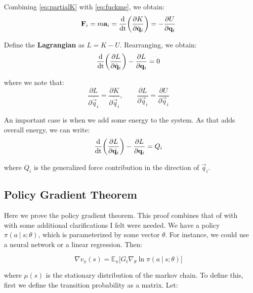 \documentclass{article}
\newcommand{\giv}{\ |\ }
\begin{document}
Combining \autoref{eq:partialK} with \autoref{eq:fuckme}, we obtain:
\begin{equation}
    \mathbf{F}_i = m \mathbf{a}_i = \frac{\mathrm{d}}{\mathrm{dt}} \bigg( \frac{\partial K}{\partial \dot{\mathbf{q}}_i} \bigg) = - \frac{\partial U}{\partial \mathbf{q}_i}
\end{equation}

Define the \textbf{Lagrangian} as $L = K - U$. Rearranging, we obtain:
\begin{equation*}
    \frac{\mathrm{d}}{\mathrm{dt}} \bigg( \frac{\partial L}{\partial \dot{\mathbf{q}}_i} \bigg) - \frac{\partial L}{\partial \mathbf{q}_i} = 0
\end{equation*}

where we note that:
\begin{equation*}
    \frac{\partial L}{\partial \dot{\vec{q}_i}} = \frac{\partial K}{\partial \dot{\vec{q}}_i}, \quad \quad \frac{\partial L}{\partial \vec{q}_i} = \frac{\partial U}{\partial \vec{q}_i}
\end{equation*}

An important case is when we add some energy to the system. As that adds overall energy, we can write:
\begin{equation*}
    \frac{\mathrm{d}}{\mathrm{dt}} \bigg( \frac{\partial L}{\partial \dot{\mathbf{q}_i}} \bigg) - \frac{\partial L}{\partial \mathbf{q}_i} = Q_i
\end{equation*}

where $Q_i$ is the generalized force contribution in the direction of $\vec{q}_i$.

\subsection{Policy Gradient Theorem}
Here we prove the policy gradient theorem. This proof combines that of \cite{sutton_learning_1988} with \cite{policy_gradient_tutorial} with some additional clarifications I felt were needed. We have a policy $\pi(a \giv s; \theta)$, which is parameterized by some vector $\theta$. For instance, we could use a neural network or a linear regression. Then:

\begin{equation*}
    \nabla v_\pi(s) = \mathbb{E}_\pi \big[
        G_t \nabla_\theta \ln \pi(a \giv s; \theta)
    \big]
\end{equation*}

where $\mu(s)$ is the stationary distribution of the markov chain. To define this, first we define the transition probability as a matrix. Let:
\end{document}
